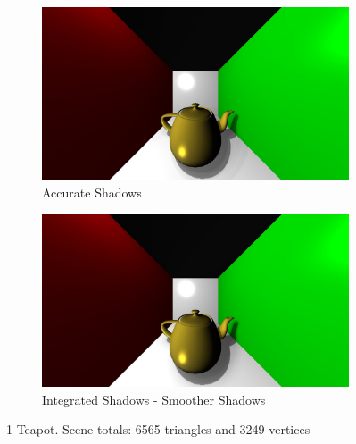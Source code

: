 \begin{figure}
        \centering
        \begin{subfigure}[b]{1.0\textwidth}
                \includegraphics[width=\textwidth]{AltResults/1teapotOLD.jpg}
                \caption{Accurate Shadows}
        \end{subfigure}
        \centering
        \begin{subfigure}[b]{1.0\textwidth}
                \includegraphics[width=\textwidth]{AltResults/1Teapot.jpg}
                \caption{Integrated Shadows - Smoother Shadows}
        \end{subfigure}
        \caption{1 Teapot. Scene totals: 6565 triangles and 3249 vertices}\label{fig:teapotCompare}
\end{figure}


